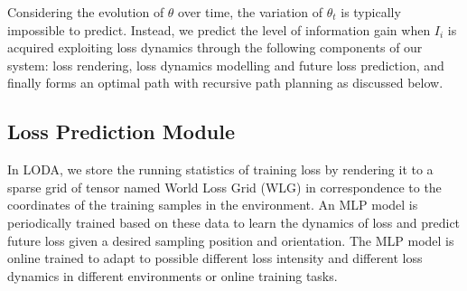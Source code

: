 Considering the evolution of $\theta$ over time, the variation of $\theta_t$ is typically impossible to predict. %
Instead, we predict the level of information gain when $I_{i}$ is acquired exploiting loss dynamics through the following components of our system: loss rendering, loss dynamics modelling and future loss prediction, and finally forms an optimal path with recursive path planning as discussed below.

\vspace{-0.5cm}
\subsection{Loss Prediction Module}
In LODA, we store the running statistics of training loss by rendering it to a sparse grid of tensor named World Loss Grid (WLG) in correspondence to the coordinates of the training samples in the environment.
An MLP model is periodically trained based on these data to learn the dynamics of loss and predict future loss given a desired sampling position and orientation.
The MLP model is online trained to adapt to possible different loss intensity and different loss dynamics in different environments or online training tasks.


